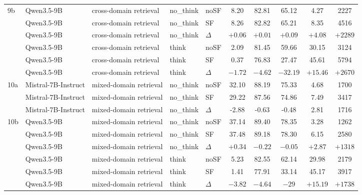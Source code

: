 \begin{scriptsize}
\begin{longtable}{l l l l l c c c c c}
9b & Qwen3.5-9B & cross-domain retrieval & no\_think & noSF & 8.20 & 82.81 & 65.12 & 4.27 & 2227 \\
 & Qwen3.5-9B & cross-domain retrieval & no\_think & SF & 8.26 & 82.82 & 65.21 & 8.35 & 4516 \\
 & Qwen3.5-9B & cross-domain retrieval & no\_think & $\Delta$ & $+0.06$ & $+0.01$ & $+0.09$ & $+4.08$ & $+2289$ \\
 & Qwen3.5-9B & cross-domain retrieval & think & noSF & 2.09 & 81.45 & 59.66 & 30.15 & 3124 \\
 & Qwen3.5-9B & cross-domain retrieval & think & SF & 0.37 & 76.83 & 27.47 & 45.61 & 5794 \\
 & Qwen3.5-9B & cross-domain retrieval & think & $\Delta$ & $-1.72$ & $-4.62$ & $-32.19$ & $+15.46$ & $+2670$ \\
\dmidrule
10a & Mistral-7B-Instruct & mixed-domain retrieval & no\_think & noSF & 32.10 & 88.19 & 75.33 & 4.68 & 1700 \\
 & Mistral-7B-Instruct & mixed-domain retrieval & no\_think & SF & 29.22 & 87.56 & 74.86 & 7.49 & 3417 \\
 & Mistral-7B-Instruct & mixed-domain retrieval & no\_think & $\Delta$ & -2.88 & -0.63 & -0.48 & 2.81 & 1716 \\
10b & Qwen3.5-9B & mixed-domain retrieval & no\_think & noSF & 37.14 & 89.40 & 78.35 & 3.28 & 1262 \\
 & Qwen3.5-9B & mixed-domain retrieval & no\_think & SF & 37.48 & 89.18 & 78.30 & 6.15 & 2580 \\
 & Qwen3.5-9B & mixed-domain retrieval & no\_think & $\Delta$ & $+0.34$ & $-0.22$ & $-0.05$ & $+2.87$ & $+1318$ \\
 & Qwen3.5-9B & mixed-domain retrieval & think & noSF & 5.23 & 82.55 & 62.14 & 29.98 & 2179 \\
 & Qwen3.5-9B & mixed-domain retrieval & think & SF & 1.41 & 77.91 & 33.14 & 45.17 & 3917 \\
 & Qwen3.5-9B & mixed-domain retrieval & think & $\Delta$ & $-3.82$ & $-4.64$ & $-29$ & $+15.19$ & $+1738$ \\
\end{longtable}
\end{scriptsize}
